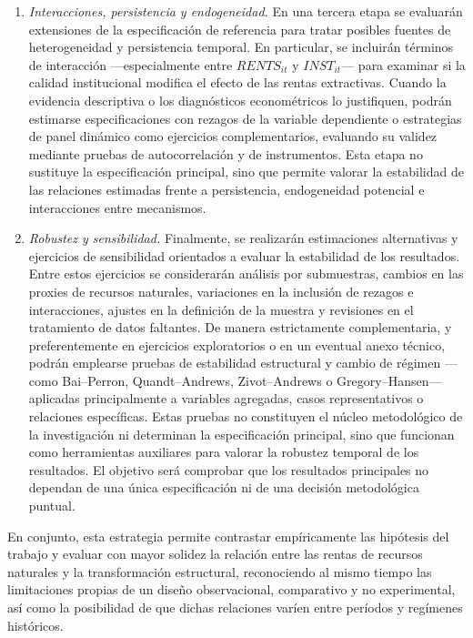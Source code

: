 \documentclass[../../PTFM.tex]{subfiles}
\begin{document}
\begin{enumerate}
		\item \emph{Interacciones, persistencia y endogeneidad.} En una tercera
		etapa se evaluarán extensiones de la especificación de referencia para
		tratar posibles fuentes de heterogeneidad y persistencia temporal. En
		particular, se incluirán términos de interacción ---especialmente entre
		$RENTS_{it}$ y $INST_{it}$--- para examinar si la calidad institucional
		modifica el efecto de las rentas extractivas. Cuando la evidencia
		descriptiva o los diagnósticos econométricos lo justifiquen, podrán
		estimarse especificaciones con rezagos de la variable dependiente o
		estrategias de panel dinámico como ejercicios complementarios, evaluando
		su validez mediante pruebas de autocorrelación y de instrumentos. Esta
		etapa no sustituye la especificación principal, sino que permite valorar
		la estabilidad de las relaciones estimadas frente a persistencia,
		endogeneidad potencial e interacciones entre mecanismos.

		\item \emph{Robustez y sensibilidad.} Finalmente, se realizarán
		estimaciones alternativas y ejercicios de sensibilidad orientados a
		evaluar la estabilidad de los resultados. Entre estos ejercicios se
		considerarán análisis por submuestras, cambios en las proxies de
		recursos naturales, variaciones en la inclusión de rezagos e
		interacciones, ajustes en la definición de la muestra y revisiones en el
		tratamiento de datos faltantes. De manera estrictamente complementaria,
		y preferentemente en ejercicios exploratorios o en un eventual anexo
		técnico, podrán emplearse pruebas de estabilidad estructural y cambio de
		régimen ---como Bai--Perron, Quandt--Andrews, Zivot--Andrews o
		Gregory--Hansen--- aplicadas principalmente a variables agregadas, casos
		representativos o relaciones específicas. Estas pruebas no constituyen
		el núcleo metodológico de la investigación ni determinan la
		especificación principal, sino que funcionan como herramientas auxiliares
		para valorar la robustez temporal de los resultados. El objetivo será
		comprobar que los resultados principales no dependan de una única
		especificación ni de una decisión metodológica puntual.

	\end{enumerate}

	En conjunto, esta estrategia permite contrastar empíricamente las
	hipótesis del trabajo y evaluar con mayor solidez la relación entre las
	rentas de recursos naturales y la transformación estructural,
	reconociendo al mismo tiempo las limitaciones propias de un diseño
	observacional, comparativo y no experimental, así como la posibilidad de
	que dichas relaciones varíen entre períodos y regímenes históricos.



\end{document}
